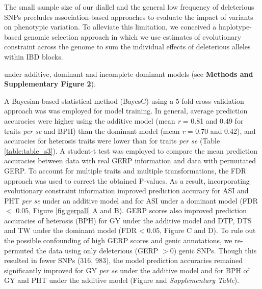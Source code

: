 \documentclass[twoside,twocolumn, letterpaper]{article}
\begin{document}
 
The small sample size of our diallel and the general low frequency of deleterious SNPs precludes association-based approaches to evaluate the impact of variants on phenotypic variation.
To alleviate this limitation, we conceived a haplotype-based genomic selection approach in which we use estimates of evolutionary constraint across the genome to sum the individual effects of deleterious alleles within IBD blocks.

under additive, dominant and incomplete dominant models (see \textbf{Methods and Supplementary Figure 2}). %

A Bayesian-based statistical method (BayesC) \citep{habier2011extension} using a 5-fold cross-validation approach was was employed for model training. 
In general, average prediction accuracies were higher using the additive model (mean \emph{r} = 0.81 and 0.49 for traits \emph{per se} and BPH) than the dominant model (mean \emph{r} = 0.70 and 0.42), and accuracies for heterosis traits were lower than for traits \emph{per se} (Table \ref{table:table_s3}).  A student-t test was employed to compare the mean prediction accuracies between data with real GERP information and data with permutated GERP. To account for multiple traits and multiple transformations, the FDR approach was used to correct the obtained P-values. As a result, incorporating evolutionary constraint information improved prediction accuracy for ASI and PHT \emph{per se} under an additive model and for ASI under a dominant model (FDR $<$ 0.05, Figure \ref{fig:gerpall} A and B).
GERP scores also improved prediction accuracies of heterosis (BPH) for GY under the additive model and DTP, DTS and TW under the dominant model (FDR < 0.05, Figure C and D). 
To rule out the possible confounding of high GERP scores and genic annotations, we re-permuted the data using only deleterious (GERP $> 0$) genic SNPs.  
Though this resulted in fewer SNPs (316, 983), the model prediction accuracies remained significantly improved for GY \emph{per se} under the additive model and for BPH of GY and PHT under the additive model (Figure and \emph{Supplementary Table}). %

\end{document}
